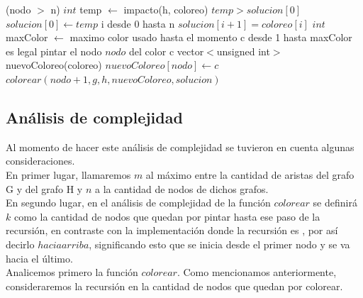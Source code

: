 \begin{algorithm}[H]
\caption{} 
\begin{codebox}

\li \If (nodo $>$ n) \Do
\li 	$int$ temp $\gets$ impacto(h, coloreo)
\li		\If $temp > solucion[0]$ \Do
\li			$solucion[0] \gets temp$
\li			\For i desde 0 hasta n \Do
\li				$solucion[i+1]=coloreo[i]$
			\End
		\End
	\End
\li \Else \Do
\li		$int$ maxColor $\gets $ maximo color usado hasta el momento 	
\li		\For c desde 1 hasta maxColor \Do
\li			\If es legal pintar el nodo $nodo$ del color c \Do
\li				vector$<$unsigned int$>$ nuevoColoreo(coloreo)
\li             $nuevoColoreo[nodo] \gets c$
\li             $colorear(nodo+1,g,h,nuevoColoreo,solucion)$
             \End
         \End
\End
\end{codebox}
\end{algorithm}


\subsection{Análisis de complejidad}

\indent Al momento de hacer este análisis de complejidad se tuvieron en cuenta algunas consideraciones.\\
\indent En primer lugar, llamaremos $m$ al máximo entre la cantidad de aristas del grafo G y del grafo H  y $n$ a la cantidad de nodos de dichos grafos.\\
\indent En segundo lugar, en el análisis de complejidad de la función $colorear$ se definirá $k$ como la cantidad de nodos que quedan por pintar hasta ese paso de la recursión, en contraste con la implementación donde la recursión es , por así decirlo $hacia arriba$, significando esto que se inicia desde el primer nodo y se va hacia el último.\\

\indent Analicemos primero la función $colorear$. Como mencionamos anteriormente, consideraremos la recursión en la cantidad de nodos que quedan por colorear.

